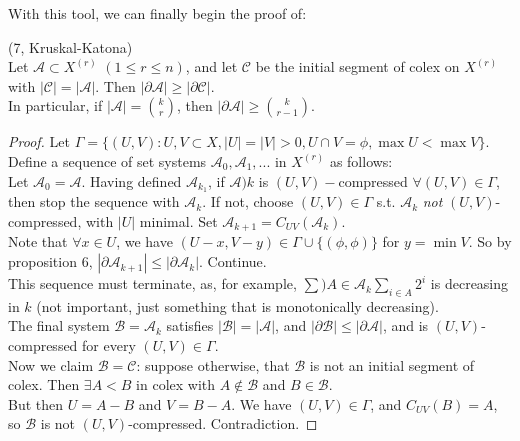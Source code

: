 \documentclass[a4paper]{article}
\begin{document}
With this tool, we can finally begin the proof of:
\begin{thm} (7, Kruskal-Katona)\\
    Let $\mathcal{A} \subset X^{(r)}$ $(1 \leq r \leq n)$, and let $\mathcal{C}$ be the initial segment of colex on $X^{(r)}$ with $|\mathcal{C}| = |\mathcal{A}|$. Then $|\partial \mathcal{A}| \geq |\partial \mathcal{C}|$.\\
    In particular, if $|\mathcal{A}| = {k \choose r}$, then $|\partial \mathcal{A}| \geq {k \choose {r-1}}$.
    \begin{proof}
        Let $\Gamma = \{(U,V): U,V \subset X, |U| = |V| > 0, U \cap V = \phi, \max U < \max V\}$.\\
        Define a sequence of set systems $\mathcal{A}_0,\mathcal{A}_1,...$ in $X^{(r)}$ as follows:\\
        Let $\mathcal{A}_0 = \mathcal{A}$. Having defined $\mathcal{A}_{k_1}$, if $\mathcal{A})k$ is $(U,V)-$compressed $\forall (U,V) \in \Gamma$, then stop the sequence with $\mathcal{A}_k$. If not, choose $(U,V) \in \Gamma$ s.t. $\mathcal{A}_k$ \emph{not} $(U,V)$-compressed, with $|U|$ minimal. Set $\mathcal{A}_{k+1} = C_{UV}(\mathcal{A}_k)$.\\
        Note that $\forall x \in U$, we have $(U-x,V-y) \in \Gamma \cup \{(\phi,\phi)\}$ for $y = \min V$. So by proposition 6, $|\partial \mathcal{A}_{k+1}| \leq |\partial \mathcal{A}_k|$. Continue.\\
        This sequence must terminate, as, for example, $\sum){A \in \mathcal{A}_k} \sum_{i \in A} 2^i$ is decreasing in $k$ (not important, just something that is monotonically decreasing).\\
        The final system $\mathcal{B} = \mathcal{A}_k$ satisfies $|\mathcal{B}| = |\mathcal{A}|$, and $|\partial \mathcal{B}| \leq |\partial \mathcal{A}|$, and is $(U,V)$-compressed for every $(U,V) \in \Gamma$.\\
        Now we claim $\mathcal{B} = \mathcal{C}$: suppose otherwise, that $\mathcal{B}$ is not an initial segment of colex. Then $\exists A < B$ in colex with $A \not\in \mathcal{B}$ and $B \in \mathcal{B}$.\\
        But then $U = A-B$ and $V=B-A$. We have $(U,V) \in \Gamma$, and $C_{UV}(B) = A$, so $\mathcal{B}$ is not $(U,V)$-compressed. Contradiction.
    \end{proof}
\end{thm}
\end{document}
